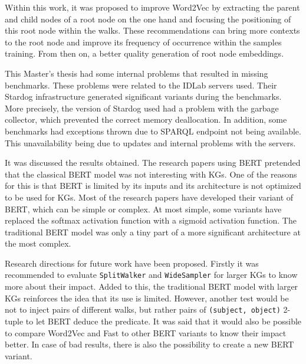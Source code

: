 Within this work, it was proposed to improve Word2Vec by extracting the parent
and child nodes of a root node on the one hand and focusing the positioning of
this root node within the walks. These recommendations can bring more contexts
to the root node and improve its frequency of occurrence within the samples
training. From then on, a better quality generation of root node embeddings.

This Master's thesis had some internal problems that resulted in missing
benchmarks. These problems were related to the IDLab servers used. Their Stardog
infrastructure generated significant variants during the benchmarks. More
precisely, the version of Stardog used had a problem with the garbage collector,
which prevented the correct memory deallocation. In addition, some benchmarks
had exceptions thrown due to SPARQL endpoint not being available. This
unavailability being due to updates and internal problems with the servers.

It was discussed the results obtained. The research papers using BERT pretended
that the classical BERT model was not interesting with KGs. One of the reasons
for this is that BERT is limited by its inputs and its architecture is not
optimized to be used for KGs. Most of the research papers have developed their
variant of BERT, which can be simple or complex. At most simple, some variants
have replaced the softmax activation function with a sigmoid activation
function. The traditional BERT model was only a tiny part of a more significant
architecture at the most complex.

Research directions for future work have been proposed. Firstly it was
recommended to evaluate \texttt{SplitWalker} and \texttt{WideSampler} for larger
KGs to know more about their impact. Added to this, the traditional BERT model
with larger KGs reinforces the idea that its use is limited. However, another
test would be not to inject pairs of different walks, but rather pairs of
\texttt{(subject, object)} 2-tuple to let BERT deduce the predicate. It was said
that it would also be possible to compare Word2Vec and Fast to other BERT
variants to know their impact better. In case of bad results, there is also the
possibility to create a new BERT variant.

